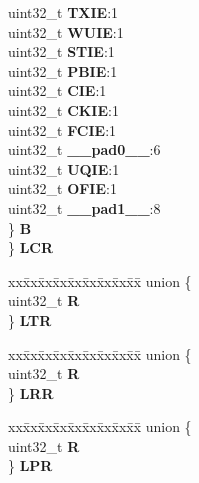 \begin{DoxyCompactItemize}
\begin{tabbing}
\>\>uint32\_t {\bfseries TXIE}:1\\
\>\>uint32\_t {\bfseries WUIE}:1\\
\>\>uint32\_t {\bfseries STIE}:1\\
\>\>uint32\_t {\bfseries PBIE}:1\\
\>\>uint32\_t {\bfseries CIE}:1\\
\>\>uint32\_t {\bfseries CKIE}:1\\
\>\>uint32\_t {\bfseries FCIE}:1\\
\>\>uint32\_t {\bfseries \_\_pad0\_\_}:6\\
\>\>uint32\_t {\bfseries UQIE}:1\\
\>\>uint32\_t {\bfseries OFIE}:1\\
\>\>uint32\_t {\bfseries \_\_pad1\_\_}:8\\
\>\} {\bfseries B}\\
\} {\bfseries LCR}\\

\end{tabbing}\item 
\mbox{\label{structESCI__tag_adf3c8be0a812efdab4f033b1d56aca23}} 
\begin{tabbing}
xx\=xx\=xx\=xx\=xx\=xx\=xx\=xx\=xx\=\kill
union \{\\
\>uint32\_t {\bfseries R}\\
\} {\bfseries LTR}\\

\end{tabbing}\item 
\mbox{\label{structESCI__tag_a39a68e6325751ae658df737bb8767fcc}} 
\begin{tabbing}
xx\=xx\=xx\=xx\=xx\=xx\=xx\=xx\=xx\=\kill
union \{\\
\>uint32\_t {\bfseries R}\\
\} {\bfseries LRR}\\

\end{tabbing}\item 
\mbox{\label{structESCI__tag_a91849fafcf5cf15a492a16506f5f2c6f}} 
\begin{tabbing}
xx\=xx\=xx\=xx\=xx\=xx\=xx\=xx\=xx\=\kill
union \{\\
\>uint32\_t {\bfseries R}\\
\} {\bfseries LPR}\\


\end{tabbing}
\end{DoxyCompactItemize}
